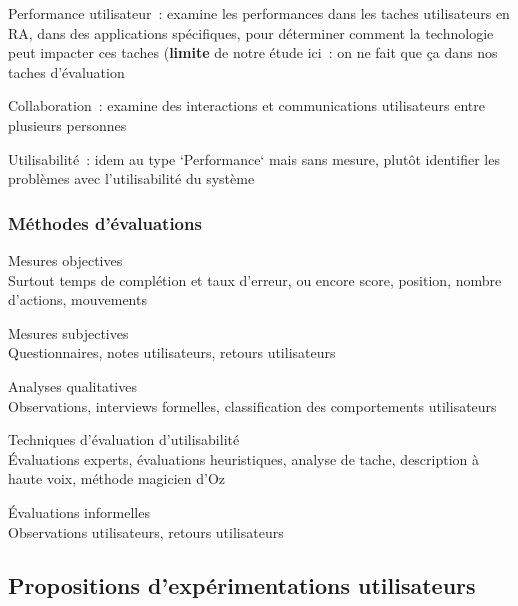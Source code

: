 Performance utilisateur~: examine les performances dans les taches utilisateurs en RA, dans des applications spécifiques, pour déterminer comment la technologie peut impacter ces taches (\textbf{limite} de notre étude ici~: on ne fait que ça dans nos taches d'évaluation

Collaboration~: examine des interactions et communications utilisateurs entre plusieurs personnes

Utilisabilité~: idem au type `Performance` mais sans mesure, plutôt identifier les problèmes avec l'utilisabilité du système

\subsubsection*{Méthodes d'évaluations}
Mesures objectives \\
	Surtout temps de complétion et taux d'erreur, ou encore score, position, nombre d'actions, mouvements \cite{DuenserGrassetBillinghurst2008}

Mesures subjectives \\
	Questionnaires, notes utilisateurs, retours utilisateurs \cite{DuenserGrassetBillinghurst2008}

Analyses qualitatives \\
	Observations, interviews formelles, classification des comportements utilisateurs \cite{DuenserGrassetBillinghurst2008}

Techniques d'évaluation d'utilisabilité \\
	Évaluations experts, évaluations heuristiques, analyse de tache, description à haute voix, méthode magicien d'Oz \cite{DuenserGrassetBillinghurst2008}

Évaluations informelles \\
	Observations utilisateurs, retours utilisateurs \cite{DuenserGrassetBillinghurst2008}


\subsection*{Propositions d'expérimentations utilisateurs}
